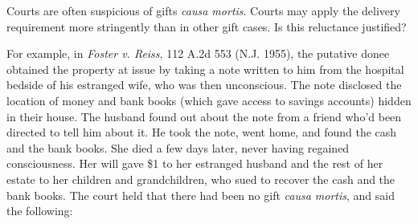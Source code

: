 Courts are often suspicious of gifts \textit{causa mortis}.  Courts may apply
the delivery requirement more stringently than in other gift cases.  Is this
reluctance justified? 

For example, in \textit{Foster v. Reiss}, 112 A.2d 553 (N.J. 1955), the
putative donee obtained the property at issue by taking a note written to him
from the hospital bedside of his estranged wife, who was then unconscious.  The
note disclosed the location of money and bank books (which gave access to
savings accounts) hidden in their house.  The husband found out about the note
from a friend who'd been directed to tell him about it.  He took the note, went
home, and found the cash and the bank books.  She died a few days later, never
having regained consciousness.  Her will gave \$1 to her estranged husband and
the rest of her estate to her children and grandchildren, who sued to recover
the cash and the bank books.  The court held that there had been no gift
\textit{causa mortis}, and said the following:
